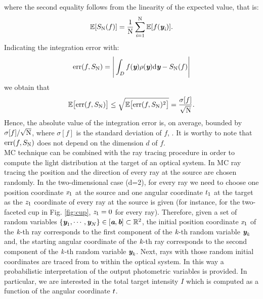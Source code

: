 where the second equality follows from the linearity of the expected value, that is:
\begin{equation}
\mathbb{E}[S_{\textrm{N}}(f)] = \frac{1}{\textrm{N}}\sum_{\textit{i}=1}^{\textrm{N}}\mathbb{E}[ f(\textit{\textbf{y}}_{\textit{i}})].
\end{equation}
Indicating the integration error with:
\begin{equation}
\textrm{err}(f, S_{\textrm{N}}) =\Bigg|\int_{D}f(\textit{\textbf{y}})\rho(\textit{\textbf{y}}) \textrm{d}\textit{\textbf{y}}-S_{\textrm{N}}(f)\Bigg|
\end{equation}
we obtain that
\begin{equation}\label{eq:mean_error}
\mathbb{E}\big[\textrm{err}(f, S_{\textrm{N}})\big]\leq\sqrt{\mathbb{E}\big[\textrm{err}(f, S_{\textrm{N}})^2\big]} = \frac{\sigma[f]}{\sqrt{\textrm{N}}}.
\end{equation}
Hence, the absolute value of the integration error is, on average, bounded by $\sigma[f]/\sqrt{\textrm{N}}$, where $\sigma[f]$ is the standard deviation of $f$, \cite{leobacher2014introduction}. It is worthy to note that $\textrm{err}(f, S_{\textrm{N}})$ does not depend on the dimension $d$ of $f$.
\\ \indent MC technique can be combined with the ray tracing procedure in order to compute the light distribution at the target of an optical system.
In MC ray tracing the position and the direction of  every ray at the source are chosen randomly. 
In the two-dimensional case (d=2), for every ray we need to choose one position coordinate $\textit{x}_1$ at the source and one angular coordinate $t_1$ at the target as the $\textit{z}_1$ coordinate of every ray at the source is given (for instance, for the two-faceted cup in Fig. \ref{fig:cup}, $\textit{z}_1=0$ for every ray). 
Therefore, given a set of random variables $\{\textit{\textbf{y}}_1, \cdots, \textit{\textbf{y}}_N\}\in [\textit{\textbf{a}}, \textit{\textbf{b}}]\subset\mathbb{R}^2$, the initial position coordinate $\textit{x}_1$ of the $\textit{k}$-th ray corresponds to the first component of the $\textit{k}$-th random variable $\textit{\textbf{y}}_{\textit{k}}$ and, the starting angular coordinate of the $\textit{k}$-th ray corresponds to the second component of the $\textit{k}$-th random variable $\textit{\textbf{y}}_{\textit{k}}$.
Next, rays with those random initial coordinates are traced from  to  within the optical system.
In this way a probabilistic interpretation of the output photometric variables is provided.
In particular, we are interested in the total target intensity $I$ which is computed as a function of the angular coordinate $t$.
